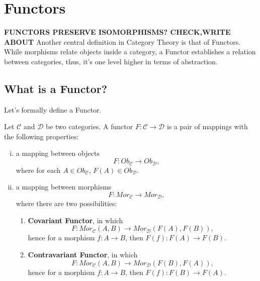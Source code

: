 \chapter{Functors}

\textbf{FUNCTORS PRESERVE ISOMORPHISMS? CHECK,WRITE ABOUT}
Another central definition in Category Theory is that of Functors.
While morphisms relate objects inside a category, a Functor
establishes a relation between categories, thus, it's one level
higher in terms of abstraction.


\section{What is a Functor?}

Let's formally define a Functor.

\begin{definition}[Functor]
	Let $\mathcal C$ and $\mathcal D$ be two categories. A functor $F: \mathcal C \to \mathcal D$ is
	a pair of mappings with the following properties:
	\begin{enumerate}[(i)]
		\item a mapping between objects
		      \begin{displaymath}
			      F:Ob_\mathcal C \to Ob_\mathcal D,
		      \end{displaymath}
		      where for each $A \in Ob_\mathcal C$, $F(A) \in Ob_\mathcal D$.
		\item a mapping between morphisms
		      \begin{displaymath}
			      F:Mor_\mathcal C \to Mor_\mathcal D,
		      \end{displaymath}
		      where there are two possibilities:
		      \begin{enumerate}
			      \item \textbf{Covariant Functor}, in which
			            \begin{displaymath}
				            F:Mor_\mathcal C(A,B) \to Mor_\mathcal D (F(A),F(B)),
			            \end{displaymath}
			            hence for a morphism $f:A \to B$, then $F(f):F(A) \to F(B)$.
			      \item \textbf{Contravariant Functor}, in which
			            \begin{displaymath}
				            F:Mor_\mathcal C(A,B) \to Mor_\mathcal D (F(B),F(A)),
			            \end{displaymath}
			            hence for a morphism $f:A \to B$, then $F(f):F(B) \to F(A)$.
		      \end{enumerate}

\end{enumerate}
\end{definition}

